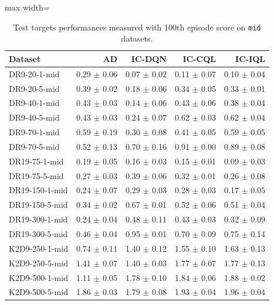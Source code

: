 \documentclass{article}
\begin{document}
\begin{table}[ht]
    \label{tab:}
    \begin{center}
    \caption{Test targets performances measured with 100th episode score on \texttt{mid} datasets.}
    \begin{small}
    \begin{adjustbox}{max width=\columnwidth}
		\begin{tabular}{l|rrrr}
		\toprule
	\textbf{Dataset} & \textbf{AD} & \textbf{IC-DQN} & \textbf{IC-CQL} & \textbf{IC-IQL}\\
\midrule
DR9-20-1-mid & 0.29 $\pm$ 0.06 & 0.07 $\pm$ 0.02 & 0.11 $\pm$ 0.07 & 0.10 $\pm$ 0.04\\
DR9-20-5-mid & 0.39 $\pm$ 0.02 & 0.18 $\pm$ 0.06 & 0.34 $\pm$ 0.05 & 0.33 $\pm$ 0.01\\
DR9-40-1-mid & 0.43 $\pm$ 0.03 & 0.14 $\pm$ 0.06 & 0.43 $\pm$ 0.06 & 0.38 $\pm$ 0.04\\
DR9-40-5-mid & 0.43 $\pm$ 0.03 & 0.24 $\pm$ 0.07 & 0.62 $\pm$ 0.03 & 0.62 $\pm$ 0.04\\
DR9-70-1-mid & 0.59 $\pm$ 0.19 & 0.30 $\pm$ 0.08 & 0.41 $\pm$ 0.05 & 0.59 $\pm$ 0.05\\
DR9-70-5-mid & 0.52 $\pm$ 0.13 & 0.70 $\pm$ 0.16 & 0.91 $\pm$ 0.00 & 0.89 $\pm$ 0.08\\
DR19-75-1-mid & 0.19 $\pm$ 0.05 & 0.16 $\pm$ 0.03 & 0.15 $\pm$ 0.01 & 0.09 $\pm$ 0.03\\
DR19-75-5-mid & 0.27 $\pm$ 0.03 & 0.39 $\pm$ 0.06 & 0.32 $\pm$ 0.01 & 0.26 $\pm$ 0.08\\
DR19-150-1-mid & 0.24 $\pm$ 0.07 & 0.29 $\pm$ 0.03 & 0.28 $\pm$ 0.03 & 0.17 $\pm$ 0.05\\
DR19-150-5-mid & 0.34 $\pm$ 0.02 & 0.67 $\pm$ 0.01 & 0.52 $\pm$ 0.06 & 0.51 $\pm$ 0.04\\
DR19-300-1-mid & 0.24 $\pm$ 0.04 & 0.48 $\pm$ 0.11 & 0.43 $\pm$ 0.03 & 0.32 $\pm$ 0.09\\
DR19-300-5-mid & 0.46 $\pm$ 0.04 & 0.95 $\pm$ 0.01 & 0.70 $\pm$ 0.09 & 0.75 $\pm$ 0.14\\
K2D9-250-1-mid & 0.74 $\pm$ 0.11 & 1.40 $\pm$ 0.12 & 1.55 $\pm$ 0.10 & 1.63 $\pm$ 0.13\\
K2D9-250-5-mid & 1.41 $\pm$ 0.07 & 1.40 $\pm$ 0.03 & 1.77 $\pm$ 0.07 & 1.77 $\pm$ 0.13\\
K2D9-500-1-mid & 1.11 $\pm$ 0.05 & 1.78 $\pm$ 0.10 & 1.84 $\pm$ 0.06 & 1.88 $\pm$ 0.02\\
K2D9-500-5-mid & 1.86 $\pm$ 0.03 & 1.79 $\pm$ 0.08 & 1.93 $\pm$ 0.04 & 1.96 $\pm$ 0.04\\

\end{tabular}
\end{adjustbox}
\end{small}
\end{center}
\end{table}
\end{document}
